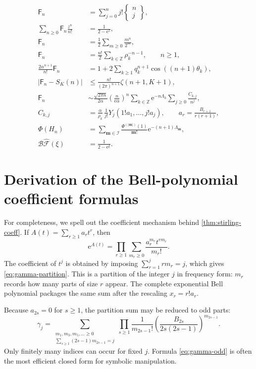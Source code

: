 \documentclass[11pt,a4paper]{article}
\theoremstyle{definition}
\theoremstyle{remark}
\newcommand{\Fub}{\mathsf F}
\newcommand{\Stirling}[2]{\left\{\!\!\begin{matrix}#1\\#2\end{matrix}\!\!\right\}}
\newcommand{\e}{\mathrm e}
\newcommand{\Borel}{\mathcal B}
\newcommand{\abs}[1]{\left|#1\right|}
\newcommand{\Z}{\mathbb Z}
\begin{document}
\begin{align}
 \Fub_n
 &=\sum_{j=0}^n j!\Stirling{n}{j},
 \label{eq:summary1}\\
 \sum_{n\ge0}\Fub_n\frac{z^n}{n!}
 &=\frac1{2-\e^z},
 \label{eq:summary2}\\
 \Fub_n
 &=\frac12\sum_{m\ge0}\frac{m^n}{2^m},
 \label{eq:summary3}\\
 \Fub_n
 &=\frac{n!}{2}\sum_{k\in\Z}\rho_k^{-n-1},
 \qquad n\ge1,
 \label{eq:summary4}\\
 \frac{2\alpha^{n+1}}{n!}\Fub_n
 &=1+2\sum_{k\ge1}q_k^{n+1}
 \cos((n+1)\theta_k),
 \label{eq:summary5}\\
 \abs{\Fub_n-S_K(n)}
 &\le \frac{n!}{(2\pi)^{n+1}}\zeta(n+1,K+1),
 \label{eq:summary6}\\
 \Fub_n
 &\sim \frac{\sqrt{2\pi n}}{2\alpha}
 \left(\frac{n}{\e\alpha}\right)^n
 \sum_{k\in\Z}\e^{-n\Lambda_k}
 \sum_{j\ge0}\frac{C_{k,j}}{n^j},
 \label{eq:summary7}\\
 C_{k,j}
 &=\frac{\alpha}{\rho_k}\,
 \frac1{j!}Y_j(1!a_1,\ldots,j!a_j),
 \qquad
 a_r=\frac{B_{r+1}}{r(r+1)},
 \label{eq:summary8}\\
 \Phi(H_n)
 &=\sum_{\bm m\in\mathcal I}
 \frac{\Phi^{(\abs{\bm m})}(1)}{\bm m!}
 \e^{-(n+1)\Lambda_{\bm m}},
 \label{eq:summary9}\\
 \Borel\widehat{\mathcal F}(\xi)
 &=\frac1{2-\e^\xi}.
 \label{eq:summary10}
\end{align}

\appendix

\section{Derivation of the Bell-polynomial coefficient formulas}

For completeness, we spell out the coefficient mechanism behind
\cref{thm:stirling-coeff}.  If
\(
 A(t)=\sum_{r\ge1}a_rt^r
\), then
\[
 \e^{A(t)}
 =\prod_{r\ge1}\sum_{m_r\ge0}\frac{a_r^{m_r}t^{rm_r}}{m_r!}.
\]
The coefficient of \(t^j\) is obtained by imposing
\(
 \sum_{r=1}^jrm_r=j
\), which gives \eqref{eq:gamma-partition}.  This is a partition of the
integer \(j\) in frequency form: \(m_r\) records how many parts of size \(r\)
appear.  The complete exponential Bell polynomial packages the same sum after
the rescaling \(x_r=r!a_r\).

Because \(a_{2s}=0\) for \(s\ge1\), the partition sum may be reduced to odd
parts:
\begin{equation}\label{eq:gamma-odd}
 \gamma_j=
 \sum_{\substack{m_1,m_3,m_5,\ldots\ge0\\
                  \sum_{s\ge1}(2s-1)m_{2s-1}=j}}
 \prod_{s\ge1}\frac1{m_{2s-1}!}
 \left(\frac{B_{2s}}{2s(2s-1)}\right)^{m_{2s-1}}.
\end{equation}
Only finitely many indices can occur for fixed \(j\).  Formula
\eqref{eq:gamma-odd} is often the most efficient closed form for symbolic
manipulation.
\end{document}

